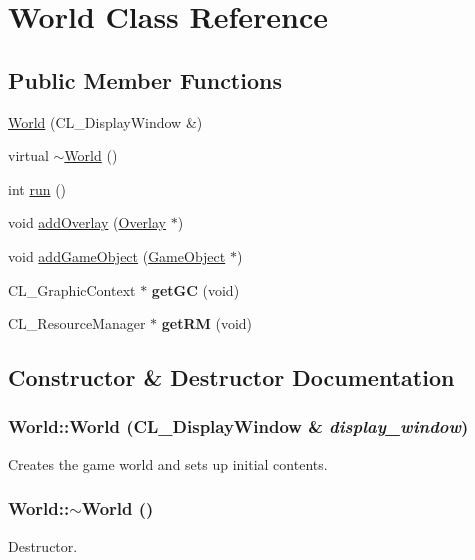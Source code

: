 \hypertarget{classWorld}{
\section{World Class Reference}
\label{classWorld}
}
\subsection*{Public Member Functions}
\begin{DoxyCompactItemize}
\item 
\hyperlink{classWorld_a6ce0c6ba5ce813c0ec0b910a88e09d64}{World} (CL\_\-DisplayWindow \&)
\item 
virtual \hyperlink{classWorld_a8c73fba541a5817fff65147ba47cd827}{$\sim$World} ()
\item 
int \hyperlink{classWorld_a0e3eea96c33cd34c6a3b05bba6b88ef5}{run} ()
\item 
void \hyperlink{classWorld_a6703e4f889e72198e0ede0cd23864792}{addOverlay} (\hyperlink{classOverlay}{Overlay} $\ast$)
\item 
void \hyperlink{classWorld_ad74a2b078f0173249b04e3da2982d081}{addGameObject} (\hyperlink{classGameObject}{GameObject} $\ast$)
\item 
\hypertarget{classWorld_a147bbd276bcff24c6d5c6ade85145545}{
CL\_\-GraphicContext $\ast$ {\bfseries getGC} (void)}
\label{classWorld_a147bbd276bcff24c6d5c6ade85145545}

\item 
\hypertarget{classWorld_ae62ed957ab6a1c8ffd58b5eeda690ce9}{
CL\_\-ResourceManager $\ast$ {\bfseries getRM} (void)}
\label{classWorld_ae62ed957ab6a1c8ffd58b5eeda690ce9}

\end{DoxyCompactItemize}


\subsection{Constructor \& Destructor Documentation}
\hypertarget{classWorld_a6ce0c6ba5ce813c0ec0b910a88e09d64}{
\subsubsection[{World}]{\setlength{\rightskip}{0pt plus 5cm}World::World (CL\_\-DisplayWindow \& {\em display\_\-window})}}
\label{classWorld_a6ce0c6ba5ce813c0ec0b910a88e09d64}
Creates the game world and sets up initial contents. \hypertarget{classWorld_a8c73fba541a5817fff65147ba47cd827}{
\subsubsection[{$\sim$World}]{\setlength{\rightskip}{0pt plus 5cm}World::$\sim$World ()}}
\label{classWorld_a8c73fba541a5817fff65147ba47cd827}
Destructor. 


